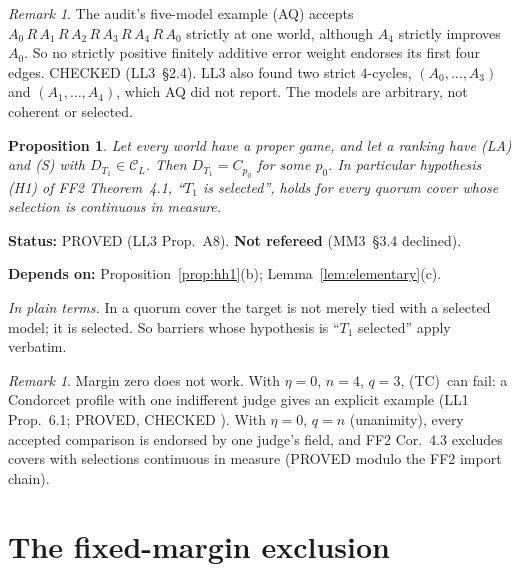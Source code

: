\documentclass[11pt]{article}
\newtheorem{proposition}[theorem]{Proposition}
\theoremstyle{definition}
\theoremstyle{remark}
\newtheorem{remark}[theorem]{Remark}
\newcommand{\C}{\mathcal C}
\newcommand{\src}[1]{\textsf{#1}}
\newcommand{\status}[1]{\par\smallskip\noindent\textbf{Status:} #1\par}
\newcommand{\deps}[1]{\noindent\textbf{Depends on:} #1\par}
\newcommand{\inwords}[1]{\noindent\textit{In plain terms.} #1\par\smallskip}
\newcommand{\TC}{\textup{(TC)}}
\begin{document}
\begin{remark}\label{rem:aq-certificate}
The audit's five-model example (\src{AQ}) accepts $A_0\,R\,A_1\,R\,A_2\,R\,A_3\,R\,A_4\,R\,A_0$ strictly at one world, although $A_4$ strictly improves $A_0$. So no strictly positive finitely additive error weight endorses its first four edges. CHECKED (\src{LL3}~\S2.4). \src{LL3} also found two strict $4$-cycles, $(A_0,\dots,A_3)$ and $(A_1,\dots,A_4)$, which \src{AQ} did not report. The models are arbitrary, not coherent or selected.
\end{remark}

\begin{proposition}\label{prop:A8}
Let every world have a proper game, and let a ranking have (LA) and (S) with $D_{T_1}\in\C_L$. Then $D_{T_1}=C_{p_0}$ for some $p_0$. In particular hypothesis (H1) of \src{FF2} Theorem~4.1, ``$T_1$ is selected'', holds for every quorum cover whose selection is continuous in measure.
\end{proposition}
\status{PROVED (\src{LL3} Prop.~A8). \textbf{Not refereed} (\src{MM3}~\S3.4 declined).}
\deps{Proposition~\ref{prop:hh1}(b); Lemma~\ref{lem:elementary}(c).}
\inwords{In a quorum cover the target is not merely tied with a selected model; it is selected. So barriers whose hypothesis is ``$T_1$ selected'' apply verbatim.}

\begin{remark}\label{rem:eta0}
Margin zero does not work. With $\eta=0$, $n=4$, $q=3$, \TC\ can fail: a Condorcet profile with one indifferent judge gives an explicit example (\src{LL1} Prop.~6.1; PROVED, CHECKED ). With $\eta=0$, $q=n$ (unanimity), every accepted comparison is endorsed by one judge's field, and \src{FF2} Cor.~4.3 excludes covers with selections continuous in measure (PROVED modulo the \src{FF2} import chain).
\end{remark}

\section{The fixed-margin exclusion}\label{sec:fixed}
\end{document}
